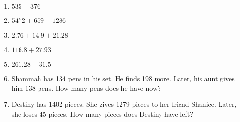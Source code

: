 \documentclass{article}
\begin{document}
\begin{enumerate}
\item \quad \( 535 - 376\)
\vspace{45pt}
\hline
\vspace{5pt}

\item \quad \( 5472 + 659 + 1286\)
\vspace{80pt}
\hline
\vspace{5pt}

\item \quad \( 2.76 + 14.9 + 21.28\)
\vspace{80pt}
\hline
\vspace{5pt}

\item \quad \( 116.8 + 27.93\)
\vspace{75pt}
\hline
\vspace{5pt}

\item \quad \( 261.28 - 31.5 \)
\vspace{80pt}
\hline
\vspace{5pt}

\item \quad Shammah has 134 pens in his set. He finds 198 more. Later, his aunt gives him 138 pens. How many pens does he have now?
\vspace{80pt}
\hline
\vspace{5pt}

\item \quad Destiny has 1402 pieces. She gives 1279 pieces to her friend Shanice. Later, she loses 45 pieces. How many pieces does Destiny have left?


\end{enumerate}
\end{document}
